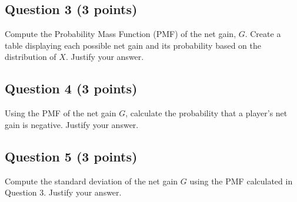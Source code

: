 \documentclass{article}
\begin{document}
\subsection*{Question 3 (3 points)}
Compute the Probability Mass Function (PMF) of the net gain, \(G\). Create a table displaying each possible net gain and its probability based on the distribution of \(X\). Justify your answer.

\begin{center}
\end{center}

\subsection*{Question 4 (3 points)}
Using the PMF of the net gain \(G\), calculate the probability that a player's net gain is negative. Justify your answer.

\begin{center}
\end{center}

\subsection*{Question 5 (3 points)}
Compute the standard deviation of the net gain \(G\) using the PMF calculated in Question 3. Justify your answer.

\begin{center}
\end{center}
\end{document}
